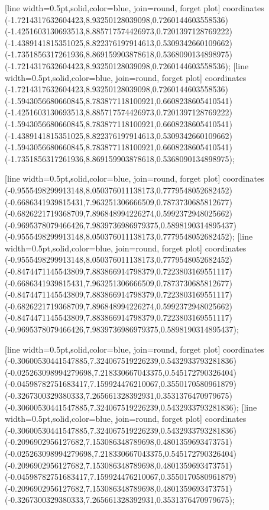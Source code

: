 [line width=0.5pt,solid,color=blue, join=round, forget plot] coordinates {(-1.7214317632604423,8.93250128039098,0.7260144603558536) (-1.4251603130693513,8.885717574426973,0.7201397128769222) (-1.4389141815351025,8.822376197914613,0.5309342660109662) (-1.7351856317261936,8.869159903878618,0.5368090134898975) (-1.7214317632604423,8.93250128039098,0.7260144603558536)};
[line width=0.5pt,solid,color=blue, join=round, forget plot] coordinates {(-1.7214317632604423,8.93250128039098,0.7260144603558536) (-1.5943056680660845,8.783877118100921,0.6608238605410541) (-1.4251603130693513,8.885717574426973,0.7201397128769222) (-1.5943056680660845,8.783877118100921,0.6608238605410541) (-1.4389141815351025,8.822376197914613,0.5309342660109662) (-1.5943056680660845,8.783877118100921,0.6608238605410541) (-1.7351856317261936,8.869159903878618,0.5368090134898975)};

[line width=0.5pt,solid,color=blue, join=round, forget plot] coordinates {(-0.9555498299913148,8.050376011138173,0.7779548052682452) (-0.6686341939815431,7.963251306666509,0.7873730685812677) (-0.6826221719368709,7.896848994226274,0.5992372948025662) (-0.9695378079466426,7.9839736986979375,0.5898190314895437) (-0.9555498299913148,8.050376011138173,0.7779548052682452)};
[line width=0.5pt,solid,color=blue, join=round, forget plot] coordinates {(-0.9555498299913148,8.050376011138173,0.7779548052682452) (-0.8474471145543809,7.883866914798379,0.7223803169551117) (-0.6686341939815431,7.963251306666509,0.7873730685812677) (-0.8474471145543809,7.883866914798379,0.7223803169551117) (-0.6826221719368709,7.896848994226274,0.5992372948025662) (-0.8474471145543809,7.883866914798379,0.7223803169551117) (-0.9695378079466426,7.9839736986979375,0.5898190314895437)};

[line width=0.5pt,solid,color=blue, join=round, forget plot] coordinates {(-0.30600530441547885,7.324067519226239,0.5432933793281836) (-0.025263098994279698,7.218330667043375,0.545172790326404) (-0.04598782751683417,7.159924476210067,0.3550170580961879) (-0.3267300329380333,7.265661328392931,0.3531376470979675) (-0.30600530441547885,7.324067519226239,0.5432933793281836)};
[line width=0.5pt,solid,color=blue, join=round, forget plot] coordinates {(-0.30600530441547885,7.324067519226239,0.5432933793281836) (-0.2096902956127682,7.153086348789698,0.4801359693473751) (-0.025263098994279698,7.218330667043375,0.545172790326404) (-0.2096902956127682,7.153086348789698,0.4801359693473751) (-0.04598782751683417,7.159924476210067,0.3550170580961879) (-0.2096902956127682,7.153086348789698,0.4801359693473751) (-0.3267300329380333,7.265661328392931,0.3531376470979675)};

